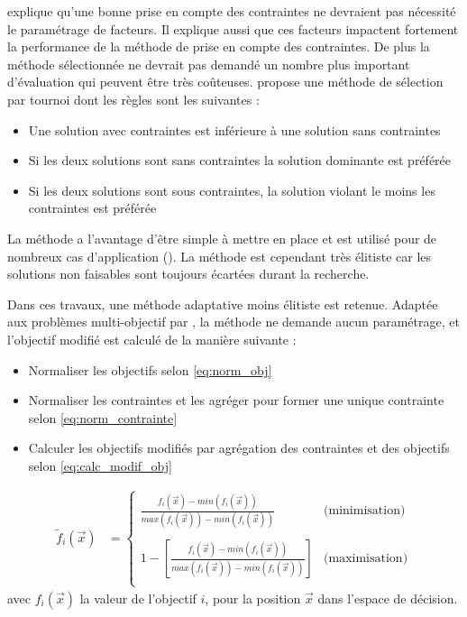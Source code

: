 \cite{Coello2002} explique qu’une bonne prise en compte des contraintes ne devraient
pas nécessité le paramétrage de facteurs. Il explique aussi que ces facteurs impactent
fortement la performance de la méthode de prise en compte des contraintes. De plus
la méthode sélectionnée ne devrait pas demandé un nombre plus important d’évaluation
qui peuvent être très coûteuses. \cite{Deb2000311} propose une méthode de
sélection par tournoi dont les règles sont les suivantes :
\begin{itemize}
  \item Une solution avec contraintes est inférieure à une solution sans contraintes
  \item Si les deux solutions sont sans contraintes la solution dominante est préférée
  \item Si les deux solutions sont sous contraintes, la solution violant le moins les contraintes est préférée
\end{itemize}
La méthode a l’avantage d’être simple à mettre en place et est utilisé pour de nombreux
cas d’application (). La méthode est cependant
très élitiste car les solutions non faisables sont toujours écartées durant la
recherche.

Dans ces travaux, une méthode adaptative moins élitiste est retenue. Adaptée
aux problèmes multi-objectif par \cite{Woldesenbet20073077}, la méthode ne demande
aucun paramétrage, et l’objectif modifié est calculé de la manière suivante :
\begin{itemize}
  \item Normaliser les objectifs selon \eqref{eq:norm_obj}
  \item Normaliser les contraintes et les agréger pour former une unique contrainte selon \eqref{eq:norm_contrainte}
  \item Calculer les objectifs modifiés par agrégation des contraintes et des objectifs selon \eqref{eq:calc_modif_obj}
\end{itemize}

\begin{align}\label{eq:norm_obj}
  \tilde{f}_{i}(\vec{x}) &= \begin{cases}
    \frac{f_{i}(\vec{x}) - min(f_{i}(\vec{x}))}{max(f_{i}(\vec{x})) - min(f_{i}(\vec{x}))} & \text{(minimisation)} \\ \\
    1 - \left[\frac{f_{i}(\vec{x}) - min(f_{i}(\vec{x}))}{max(f_{i}(\vec{x})) - min(f_{i}(\vec{x}))}\right] & \text{(maximisation)} \\
  \end{cases}
\end{align}
avec $f_{i}(\vec{x})$ la valeur de l’objectif $i$, pour la position $\vec{x}$ dans l’espace de décision.

